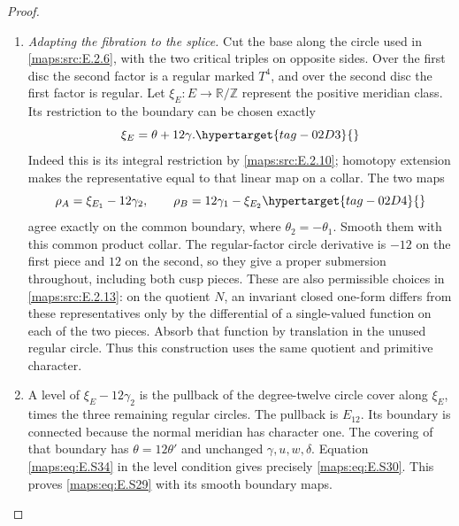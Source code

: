 \documentclass[11pt,a4paper]{article}
\numberwithin{equation}{section}
\theoremstyle{definition}
\begin{document}
\begin{proof}
\begin{enumerate}[label=\arabic*.,leftmargin=*]
\item \emph{Adapting the fibration to the splice.}
Cut the base along the circle used in \ref{maps:src:E.2.6}, with the two
critical triples on opposite sides. Over the first disc the
second factor is a regular marked $T^4$, and over the second
disc the first factor is regular. Let
$\xi_E:E\to\mathbb R/\mathbb Z$ represent the positive
meridian class. Its restriction to the boundary can be
chosen exactly
\begin{equation}
                         \xi_E=\theta+12\gamma.
 \hypertarget{tag-02D3}{}\label{maps:eq:E.S34}
\end{equation}
Indeed this is its integral restriction by \ref{maps:src:E.2.10}; homotopy
extension makes the representative equal to that linear
map on a collar. The two maps
\begin{equation}
        \rho_A=\xi_{E_1}-12\gamma_2,
             \qquad \rho_B=12\gamma_1-\xi_{E_2}
 \hypertarget{tag-02D4}{}\label{maps:eq:E.S35}
\end{equation}
agree exactly on the common boundary, where
$\theta_2=-\theta_1$. Smooth them with this common product
collar. The regular-factor circle derivative is $-12$ on
the first piece and $12$ on the second, so they give a
proper submersion throughout, including both cusp pieces.
These are also permissible choices in \cref{maps:src:E.2.13}: on the
quotient $N$, an invariant closed one-form differs from
these representatives only by the differential of a
single-valued function on each of the two pieces. Absorb
that function by translation in the unused regular circle.
Thus this construction uses the same quotient and
primitive character.

\item A level of $\xi_E-12\gamma_2$ is the pullback of the
degree-twelve circle cover along $\xi_E$, times the three
remaining regular circles. The pullback is $E_{12}$.
Its boundary is connected because the normal meridian has
character one. The covering of that boundary has
$\theta=12\theta'$ and unchanged $\gamma,u,w,\delta$.
Equation \eqref{maps:eq:E.S34} in the level condition gives precisely
\eqref{maps:eq:E.S30}. This proves \eqref{maps:eq:E.S29} with its smooth
boundary maps.


\end{enumerate}
\end{proof}
\end{document}
